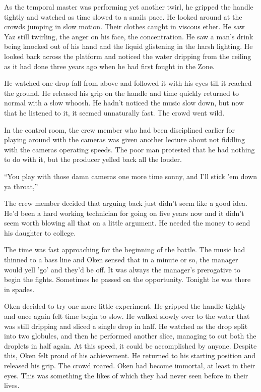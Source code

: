 As the temporal master was performing yet another twirl, he gripped the handle tightly and watched as time slowed to a snails pace.  He looked around at the crowds jumping in slow motion.  Their clothes caught in viscous ether.  He saw Yaz still twirling, the anger on his face, the concentration.  He saw a man's drink being knocked out of his hand and the liquid glistening in the harsh lighting.  He looked back across the platform and noticed the water dripping from the ceiling as it had done three years ago when he had first fought in the Zone.  

He watched one drop fall from above and followed it with his eyes till it reached the ground.  He released his grip on the handle and time quickly returned to normal with a slow whoosh.  He hadn't noticed the music slow down, but now that he listened to it, it seemed unnaturally fast.  The crowd went wild.

In the control room, the crew member who had been disciplined earlier for playing around with the cameras was given another lecture about not fiddling with the cameras operating speeds.  The poor man protested that he had nothing to do with it, but the producer yelled back all the louder.

``You play with those damn cameras one more time sonny, and I'll stick 'em down ya throat,''

The crew member decided that arguing back just didn't seem like a good idea.  He'd been a hard working technician for going on five years now and it didn't seem worth blowing all that on a little argument.  He needed the money to send his daughter to college.

The time was fast approaching for the beginning of the battle.  The music had thinned to a bass line and Oken sensed that in a minute or so, the manager would yell 'go' and they'd be off.  It was always the manager's prerogative to begin the fights.  Sometimes he passed on the opportunity.  Tonight he was there in spades.  

Oken decided to try one more little experiment.  He gripped the handle tightly and once again felt time begin to slow.  He walked slowly over to the water that was still dripping and sliced a single drop in half.  He watched as the drop split into two globules, and then he performed another slice, managing to cut both the droplets in half again.  At this speed, it could be accomplished by anyone.  Despite this, Oken felt proud of his achievement.  He returned to his starting position and released his grip.  The crowd roared.  Oken had become immortal, at least in their eyes.  This was something the likes of which they had never seen before in their lives.

